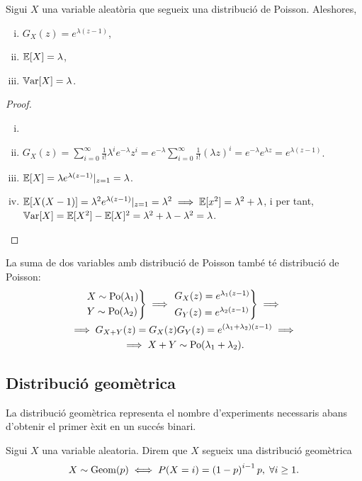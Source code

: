 \begin{prop}
    Sigui $X$ una variable aleatòria que segueix una distribució de Poisson. Aleshores,
    \begin{enumerate}[i)]
        \item $G_X(z) = e^{\lambda(z-1)}$,
        \item $\operatorname{\mathbb{E}}[X] = \lambda$,
        \item $\operatorname{\mathbb{V}ar}[X] = \lambda$.
    \end{enumerate}
\end{prop}

\begin{proof}
    \begin{enumerate}[i)]
        \item[]
        \item $G_X(z) = \sum\limits_{i=0}^\infty \frac{1}{i!}\lambda^i e^{-\lambda} z^i =
            e^{-\lambda} \sum\limits_{i=0}^\infty \frac{1}{i!}(\lambda z)^i = e^{-\lambda}e^{\lambda z} = e^{\lambda(z-1)}$.
        \item $\operatorname{\mathbb{E}}[X] = \lambda e^{\lambda(z-1)}|_{z=1} = \lambda$.
        \item $\operatorname{\mathbb{E}}[X(X-1)] = \lambda^2 e^{\lambda(z-1)}|_{z=1} = \lambda^2 \implies \operatorname{\mathbb{E}}[x^2] = \lambda^2+\lambda$,  i per tant, 
         $\operatorname{\mathbb{V}ar}[X] = \operatorname{\mathbb{E}}[X^2] - \operatorname{\mathbb{E}}[X]^2 = \lambda^2 + \lambda - \lambda^2 = \lambda$.
    \end{enumerate}
\end{proof}

\begin{obs} La suma de dos variables amb distribució de Poisson també té distribució de Poisson:
    \begin{gather*}
    \begin{rcases*} X \sim \operatorname{Po}(\lambda_1) \\ Y \sim \operatorname{Po}(\lambda_2) \end{rcases*} \implies
    \begin{rcases*} G_X(z) = e^{\lambda_1(z-1)} \\ G_Y(z) = e^{\lambda_2(z-1)} \end{rcases*}
    \implies \\
    \implies G_{X+Y}(z) = G_X(z)G_Y(z) = e^{(\lambda_1+\lambda_2)(z-1)} \implies \\
    \implies X+Y \sim \operatorname{Po}(\lambda_1+\lambda_2).
    \end{gather*}
\end{obs}

\subsection*{Distribució geomètrica}
La distribució geomètrica representa el nombre d'experiments necessaris abans d'obtenir el primer èxit en un succés binari.
\begin{defi}
    Sigui $X$ una variable aleatoria. Direm que $X$ segueix una distribució geomètrica
    \[X \sim \operatorname{Geom}(p) \iff P(X=i) = \left( 1-p \right) ^{i-1}p,\;\forall i\geq1.\]
\end{defi}

